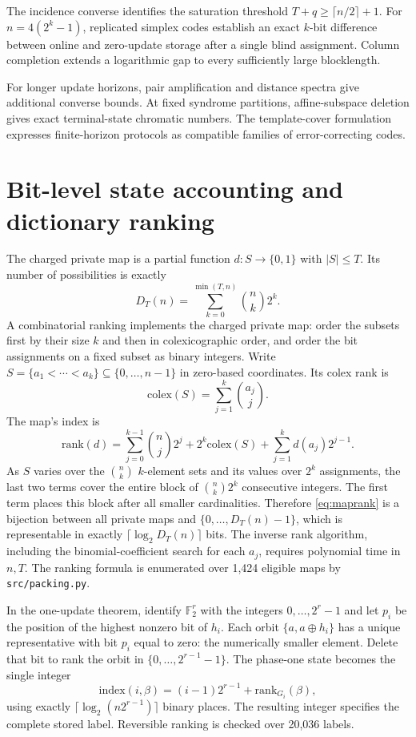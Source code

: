 \documentclass[11pt,a4paper]{article}
\newcommand{\F}{\mathbb F_2}
\begin{document}
The incidence converse identifies the saturation threshold $T+q\ge\lceil n/2\rceil+1$. For $n=4(2^k-1)$, replicated simplex codes establish an exact $k$-bit difference between online and zero-update storage after a single blind assignment. Column completion extends a logarithmic gap to every sufficiently large blocklength.

For longer update horizons, pair amplification and distance spectra give additional converse bounds. At fixed syndrome partitions, affine-subspace deletion gives exact terminal-state chromatic numbers. The template-cover formulation expresses finite-horizon protocols as compatible families of error-correcting codes.

\appendix

\section{Bit-level state accounting and dictionary ranking}
The charged private map is a partial function $d:S\to\{0,1\}$ with $|S|\le T$. Its number of possibilities is exactly
\[
D_T(n)=\sum_{k=0}^{\min(T,n)}\binom nk2^k.
\]
A combinatorial ranking implements the charged private map: order the subsets first by their size $k$ and then in colexicographic order, and order the bit assignments on a fixed subset as binary integers. Write $S=\{a_1<\cdots<a_k\}\subseteq\{0,\ldots,n-1\}$ in zero-based coordinates. Its colex rank is
\[
 \mathrm{colex}(S)=\sum_{j=1}^k\binom{a_j}{j}.
\]
The map's index is
\begin{equation}\label{eq:maprank}
\mathrm{rank}(d)=\sum_{j=0}^{k-1}\binom nj2^j
  + 2^k\mathrm{colex}(S)+\sum_{j=1}^{k}d(a_j)2^{j-1}.
\end{equation}
As $S$ varies over the $\binom nk$ $k$-element sets and its values over $2^k$ assignments, the last two terms cover the entire block of $\binom nk2^k$ consecutive integers. The first term places this block after all smaller cardinalities. Therefore \eqref{eq:maprank} is a bijection between all private maps and $\{0,\ldots,D_T(n)-1\}$, which is representable in exactly $\lceil\log_2D_T(n)\rceil$ bits. The inverse rank algorithm, including the binomial-coefficient search for each $a_j$, requires polynomial time in $n,T$. The ranking formula is enumerated over 1,424 eligible maps by \texttt{src/packing.py}.

In the one-update theorem, identify $\F^r$ with the integers $0,\ldots,2^r-1$ and let $p_i$ be the position of the highest nonzero bit of $h_i$. Each orbit $\{a,a\oplus h_i\}$ has a unique representative with bit $p_i$ equal to zero: the numerically smaller element. Delete that bit to rank the orbit in $\{0,\ldots,2^{r-1}-1\}$. The phase-one state becomes the single integer
\[
 \mathrm{index}(i,\beta)=(i-1)2^{r-1}+\mathrm{rank}_{G_i}(\beta),
\]
using exactly $\lceil\log_2(n2^{r-1})\rceil$ binary places. The resulting integer specifies the complete stored label. Reversible ranking is checked over 20,036 labels.
\end{document}
